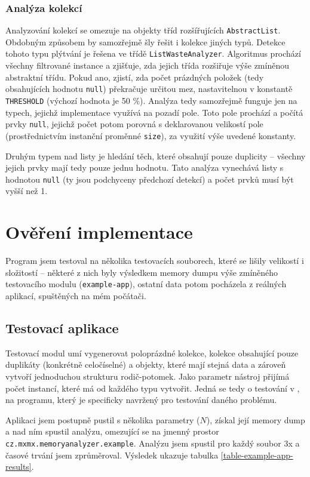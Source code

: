 \subsection{Analýza kolekcí}
Analyzování kolekcí se omezuje na objekty tříd rozšířujících \texttt{AbstractList}. Obdobným způsobem by samozřejmě šly řešit i kolekce jiných typů. Detekce tohoto typu plýtvání je řešena ve třídě \texttt{ListWasteAnalyzer}. Algoritmus prochází všechny filtrované instance a zjišťuje, zda jejich třída rozšiřuje výše zmíněnou abstraktní třídu. Pokud ano, zjistí, zda počet prázdných položek (tedy obsahujících hodnotu \texttt{null}) překračuje určitou mez, nastavitelnou v konstantě \texttt{THRESHOLD} (výchozí hodnota je 50 \%). Analýza tedy samozřejmě funguje jen na typech, jejichž implementace využívá na pozadí pole. Toto pole prochází a počítá prvky \texttt{null}, jejichž počet potom porovná s deklarovanou velikostí pole (prostřednictvím instanční proměnné \texttt{size}), za využití výše uvedené konstanty.

Druhým typem nad listy je hledání těch, které obsahují pouze duplicity -- všechny jejich prvky mají tedy pouze jednu hodnotu. Tato analýza vynechává listy s hodnotou \texttt{null} (ty jsou podchyceny předchozí detekcí) a počet prvků musí být vyšší než 1.

\chapter{Ověření implementace}
Program jsem testoval na několika testovacích souborech, které se lišily velikostí i složitostí -- některé z nich byly výsledkem memory dumpu výše zmíněného testovacího modulu (\texttt{example-app}), ostatní data potom pocházela z reálných aplikací, spuštěných na mém počátači. 

\section{Testovací aplikace}
Testovací modul umí vygenerovat poloprázdné kolekce, kolekce obsahující pouze duplikáty (konkrétně celočíselné) a objekty, které mají stejná data a zároveň vytvoří jednoduchou strukturu rodič-potomek. Jako parametr nástroj přijímá počet instancí, které má od každého typu vytvořit. Jedná se tedy o testování v , na programu, který je specificky navržený pro testování daného problému.

Aplikaci jsem postupně pustil s několika parametry ($N$), získal její memory dump a nad ním spustil analýzu, omezující se na jmenný prostor \texttt{cz.mx\-mx.me\-mory\-analyzer.e\-xa\-mple}. Analýzu jsem spustil pro každý soubor 3x a časové trvání jsem zprůměroval. Výsledek ukazuje tabulka \ref{table-example-app-results}.

